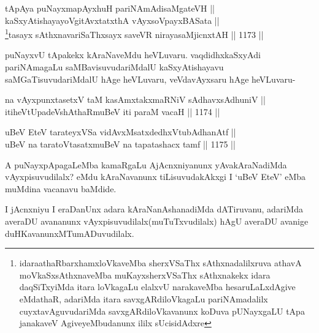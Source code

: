 \begin{shl}
tApAya puNayxmapAyxhuH pariNAmAdisaMgateVH || \\
kaSxyAtishayayoVgitAvxtatxthA vAyxsoV\s payxBASata || \\
\footnote{idaraathaR\ndash  barxhamxloVkaveMba sherxVSaThx sAthxnadalilxruva athavA moVkaSxsAthxnaveMba muKayxsherxVSaThx sAthxnakekx idara daqSiTxyiMda itara loVkagaLu elalxvU narakaveMba hesaruLaLxdAgive eMdathaR, adariMda itara savxgARdiloVkagaLu pariNAmadalilx cuyxtavAguvudariMda savxgARdiloVkavanunx koDuva pUNayxgaLU tApa janakaveV AgiveyeMbudanunx ililx sUcisidAdxre}tasayx sAthxnavariSaThxsayx saveVR nirayasaMjicnxtAH \hfill || 1173 ||  
\end{shl}	

\begin{artha}
puNayxvU tApakekx kAraNaveMdu heVLuvaru. vaqdidhxkaSxyAdi pariNAmagaLu saMBavisuvudariMdalU kaSxyAtishayavu saMGaTisuvudariMdalU hAge heVLuvaru, veVdavAyxsaru hAge heVLuvaru-
\end{artha}




\begin{shl}
na vAyxpunxtasetxV taM kasAmxtakxmaRNiV sAdhavxsAdhuniV || \\
itiheVtUpadeVshAthaRmuBeV iti paraM vacaH \hfill || 1174 ||  
\end{shl}
				
\begin{shl}
uBeV EteV tarateyxVSa vidAvxMsatxdedhxVtubAdhanAtf || \\
uBeV na taratoV\s tasatxmuBeV na tapatashacx tamf \hfill || 1175 ||  
\end{shl}

\begin{artha}
A puNayxpApagaLeMba kamaRgaLu AjAcnxniyanunx yAvakAraNadiMda vAyxpisuvudilalx? eMdu 
kAraNavanunx tiLisuvudakAkxgi I `uBeV EteV' eMba muMdina vacanavu baMdide.
\end{artha}

\begin{artha}
I jAcnxniyu I eraDanUnx adara kAraNanAshanadiMda dATiruvanu, adariMda averaDU avananunx vAyxpisuvudilalx(muTuTxvudilalx) hAgU averaDU avanige duHKavanunxMTumADuvudilalx.
\end{artha}

